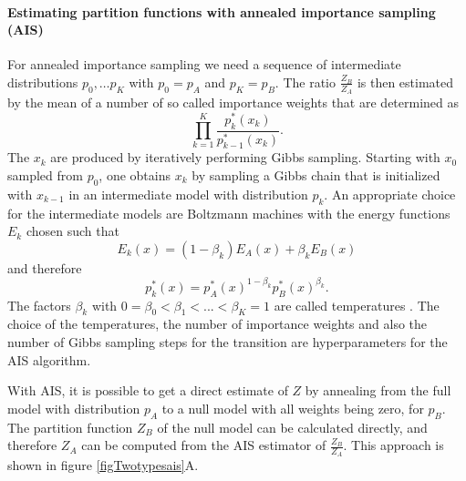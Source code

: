 \documentclass[12pt]{article}
\begin{document}
\paragraph{Estimating partition functions with annealed importance sampling (AIS)}\label{methodAIS}

For annealed importance sampling we need a sequence of intermediate distributions
$p_0, \dots p_K$ with
$p_0 = p_A$ and $p_K = p_B$. The ratio $\frac{Z_B}{Z_A}$ is then estimated by the mean of a number of so called importance weights that are determined as
\[
   \prod_{k=1}^K \frac{p^*_k(x_k)}{p^*_{k-1}(x_{k})}.
\]
The $x_k$ are produced by iteratively performing Gibbs sampling. Starting with $x_0$ sampled from $p_0$, one obtains $x_k$ by sampling a Gibbs chain that is initialized with $x_{k-1}$ in an intermediate model with distribution $p_k$. An appropriate choice for the intermediate models are Boltzmann machines with the energy functions $E_k$ chosen such that
\[
   E_k(x) = (1 - \beta_k) E_A(x) + \beta_k E_B(x)
\]
and therefore
\[
   p_k^*(x) = p_A^*(x)^{1-\beta_k} p_B^*(x)^{\beta_k}.
\]
The factors $\beta_k$ with $0 = \beta_0 < \beta_1 < ... < \beta_K = 1$ are called temperatures \citep{salakhutdinov2008learning}.
The choice of the temperatures, the number of importance weights and also the number of Gibbs sampling steps for the transition are hyperparameters for the AIS algorithm.

With AIS, it is possible to get a direct estimate of $Z$ by annealing from the full model with distribution $p_A$ to a null model with all weights being zero, for $p_B$.
The partition function $Z_B$ of the null model can be calculated directly, and therefore $Z_A$ can be computed from the AIS estimator of $\frac{Z_B}{Z_A}$. This approach is shown in figure \ref{figTwotypesais}A.
\end{document}
